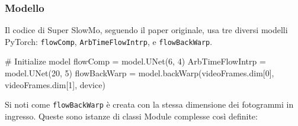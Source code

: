 \subsubsection*{Modello}

Il codice di Super SlowMo, seguendo il paper originale, usa tre diversi modelli PyTorch: 
\texttt{flowComp}, \texttt{ArbTimeFlowIntrp}, e \texttt{flowBackWarp}.

\begin{Python}
# Initialize model
flowComp = model.UNet(6, 4)
ArbTimeFlowIntrp = model.UNet(20, 5)
flowBackWarp = model.backWarp(videoFrames.dim[0], videoFrames.dim[1], device)
\end{Python}

Si noti come \texttt{flowBackWarp} è creata con la stessa dimensione dei fotogrammi in 
ingresso. Queste sono istanze di classi Module complesse così definite:

